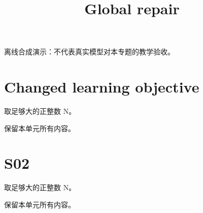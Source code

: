 \documentclass[UTF8,fontset=fandol,11pt]{ctexart}
\title{Global repair}
\date{}
\begin{document}
\maketitle
\par\noindent 离线合成演示：不代表真实模型对本专题的教学验收。\par
\section{Changed learning objective}\label{sec:S01}
取足够大的正整数 N。\par
保留本单元所有内容。\par
\section{S02}\label{sec:S02}
取足够大的正整数 N。\par
保留本单元所有内容。\par
\end{document}
